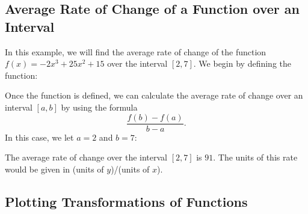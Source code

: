 
\subsection{Average Rate of Change of a Function over an Interval}

In this example, we will find the average rate of change of the function $f(x) = -2x^3 + 25x^2 + 15$ over the interval $[2,7]$. We begin by defining the function:

\begin{maplegroup}
\begin{mapleinput}
\end{mapleinput}
\mapleresult
\begin{maplelatex}
\end{maplelatex}
\end{maplegroup}

Once the function is defined, we can calculate the average rate of change over an interval $[a,b]$ by using the formula \[ \frac{f(b)-f(a)}{b-a}. \] 
In this case, we let $a=2$ and $b=7$:

\begin{maplegroup}
\begin{mapleinput}
\end{mapleinput}
\mapleresult
\begin{maplelatex}
\end{maplelatex}
\end{maplegroup}
\begin{maplegroup}
\begin{mapleinput}
\end{mapleinput}
\end{maplegroup}

\noindent
The average rate of change over the interval $[2,7]$ is $91$. The units of this rate would be given in (units of $y$)/(units of $x$).

\subsection{Plotting Transformations of Functions}
\label{subsec:plotting_transformations}

